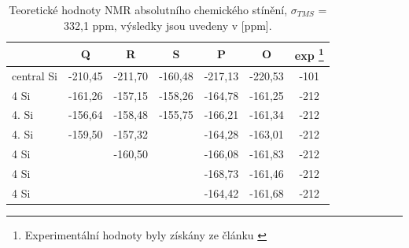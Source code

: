 \documentclass[
digital, %
table,   %
lof,     %
lot,     %
oneside,
]{fithesis3}
\begin{document}
\begin{table}[htbp]
\begin{minipage}{\textwidth}
\caption{Teoretické hodnoty NMR absolutního chemického stínění, $\sigma_{TMS}$ = 332,1 ppm, výsledky jsou uvedeny v [ppm].}
\begin{center}
\begin{tabular}{|l|c|c|c|c|c|c|}
\hline
\label{nmr} & \textbf{Q} & \textbf{R} &\textbf{S} & \textbf{P} & \textbf{O} & {exp \footnote{Experimentální hodnoty byly získány ze článku \cite{1316862}}} \\ \hline
central Si & -210,45 & -211,70 & -160,48 & -217,13 & -220,53 & -101 \\ \hline
4 Si & -161,26 & -157,15 &-158,26 & -164,78 & -161,25 & -212 \\ \hline
4. Si & -156,64 & -158,48 & -155,75 & -166,21 & -161,34 & -212 \\ \hline
4. Si & -159,50 & -157,32 &  & -164,28 & -163,01 & -212 \\ \hline
4 Si &  & -160,50 &  & -166,08 & -161,83 & -212 \\ \hline
4 Si &  &  &  & -168,73 & -161,46 & -212 \\ \hline
4 Si &  &  &  & -164,42 & -161,68 & -212 \\ \hline
\end{tabular}\end{center}\end{minipage}\end{table}
\end{document}
